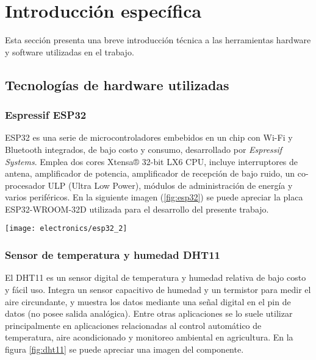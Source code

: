

\chapter{Introducción específica} %

\label{Chapter2}

Esta sección presenta una breve introducción técnica a las herramientas hardware y software utilizadas en el trabajo.

\section{Tecnologías de hardware utilizadas}

\subsection{Espressif ESP32}


ESP32 \cite{ESP32} es una serie de microcontroladores embebidos en un chip con Wi-Fi y Bluetooth integrados, de bajo costo y consumo, desarrollado por \textit{Espressif Systems}. Emplea dos cores Xtensa® 32-bit LX6 CPU, incluye interruptores de antena, amplificador de potencia, amplificador de recepción de bajo ruido, un co-procesador ULP (Ultra Low Power), módulos de administración de energía y varios periféricos.
En la siguiente imagen (\ref{fig:esp32}) se puede apreciar la placa ESP32-WROOM-32D \cite{ESP32_wroom_32d_datasheet} utilizada para el desarrollo del presente trabajo.

\begin{center}
    \texttt{[image: electronics/esp32\_2]}
    \label{fig:esp32}
\end{center}


\subsection{Sensor de temperatura y humedad DHT11}

El DHT11 \cite{DHT11_datasheet} es un sensor digital de temperatura y humedad relativa de bajo costo y fácil uso. Integra un sensor capacitivo de humedad y un termistor para medir el aire circundante, y muestra los datos mediante una señal digital en el pin de datos (no posee salida analógica). Entre otras aplicaciones se lo suele utilizar principalmente en aplicaciones relacionadas al control automático de temperatura, aire acondicionado y monitoreo ambiental en agricultura. En la figura \ref{fig:dht11} se puede apreciar una imagen del componente.

